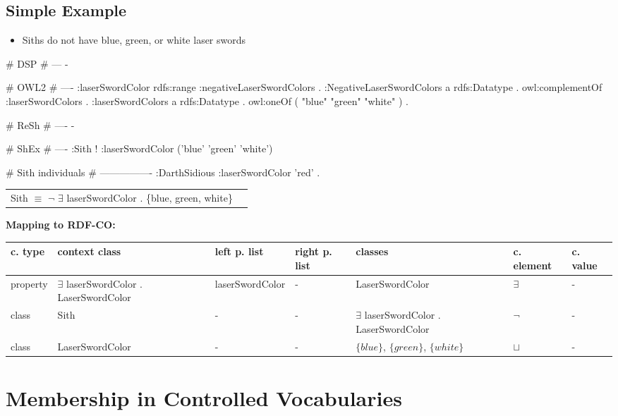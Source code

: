 \documentclass{llncs}
\newenvironment{gcotable}{
  \scriptsize
  \sffamily
  \vspace{0cm}
	\begin{center}
	\textbf{\vspace{0.4cm}Mapping to RDF-CO:} \\
  \begin{tabular}{l|l|l|l|l|l|l}
	\hline
  \textbf{c. type} & \textbf{context class} & \textbf{left p. list} & \textbf{right p. list} & \textbf{classes} & \textbf{c. element} & \textbf{c. value} \\
  \hline

}{
  \hline
  \end{tabular}
	\end{center}
}
\newenvironment{DL}{
  \vspace{0cm}
	\begin{center}
  \begin{tabular}{r l}

}{
  \end{tabular}
	\end{center}
}
\begin{document}
\subsection{Simple Example}

\begin{itemize}
	\item Siths do not have blue, green, or white laser swords
\end{itemize}

\begin{ex}
# DSP
# ---
-
\end{ex}

\begin{ex}
# OWL2
# ----
:laserSwordColor rdfs:range :negativeLaserSwordColors . 
:NegativeLaserSwordColors
    a rdfs:Datatype .
    owl:complementOf :laserSwordColors .
:laserSwordColors
    a rdfs:Datatype .
    owl:oneOf ( "blue" "green" "white" ) .
\end{ex}

\begin{ex}
# ReSh
# ----
-
\end{ex}

\begin{ex}
# ShEx
# ----
:Sith {
    ! :laserSwordColor ('blue' 'green' 'white') }
\end{ex}

\begin{ex}
# Sith individuals
# ----------------
:DarthSidious
    :laserSwordColor 'red' .
\end{ex}

\begin{DL}
Sith $\equiv$ $\neg$ $\exists$ laserSwordColor . \{blue, green, white\} \\
\end{DL}

\begin{gcotable}
property & $\exists$ laserSwordColor . LaserSwordColor & laserSwordColor & - & LaserSwordColor & $\exists$ & - \\
class & Sith & - & - & $\exists$ laserSwordColor . LaserSwordColor & $\neg$ & - \\
class & LaserSwordColor & - & - & $\{blue\}$, $\{green\}$, $\{white\}$ & $\sqcup$ & - \\
\end{gcotable}

\section{Membership in Controlled Vocabularies}
\end{document}
